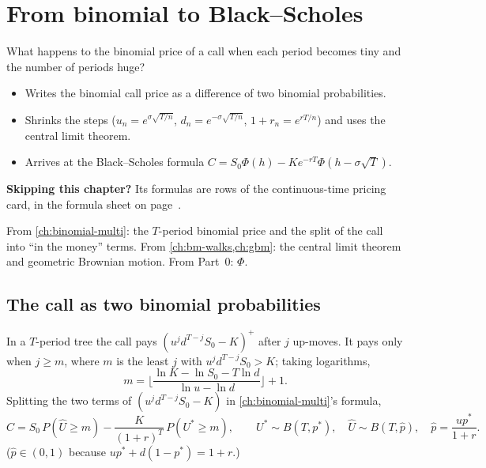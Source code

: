 \chapter{From binomial to Black--Scholes}
\label{ch:black-scholes}

\begin{question}
What happens to the binomial price of a call when each period becomes tiny and the number of periods huge?
\end{question}

\begin{whatfor}
\begin{itemize}
  \item Writes the binomial call price as a difference of two binomial probabilities.
  \item Shrinks the steps ($u_n=e^{\sigma\sqrt{T/n}}$, $d_n=e^{-\sigma\sqrt{T/n}}$, $1+r_n=e^{rT/n}$) and uses the central limit theorem.
  \item Arrives at the Black--Scholes formula $C=S_0\Phi(h)-Ke^{-rT}\Phi(h-\sigma\sqrt T)$.
\end{itemize}
\par\smallskip\textbf{Skipping this chapter?} Its formulas are rows of the continuous-time pricing card, in the formula sheet on page~\pageref{fs:mg-pricing}.
\end{whatfor}

\begin{prereq}
From \cref{ch:binomial-multi}: the $T$-period binomial price and the split of the call into ``in the money'' terms. From \cref{ch:bm-walks,ch:gbm}: the central limit theorem and geometric Brownian motion. From Part~0: $\Phi$.
\end{prereq}

\section{The call as two binomial probabilities}

In a $T$-period tree the call pays $(u^jd^{T-j}S_0-K)^+$ after $j$ up-moves. It pays only when $j\ge m$, where $m$ is the least $j$ with $u^jd^{T-j}S_0>K$; taking logarithms,
\[
  m=\Big\lfloor\frac{\ln K-\ln S_0-T\ln d}{\ln u-\ln d}\Big\rfloor+1 .
\]
Splitting the two terms of $(u^jd^{T-j}S_0-K)$ in \cref{ch:binomial-multi}'s formula,
\[
  C=S_0\,P(\hat U\ge m)-\frac{K}{(1+r)^T}\,P(U^*\ge m),\qquad U^*\sim B(T,p^*),\quad \hat U\sim B(T,\hat p),\quad \hat p=\frac{up^*}{1+r}. \tag{$\star$}
\]
($\hat p\in(0,1)$ because $up^*+d(1-p^*)=1+r$.)

